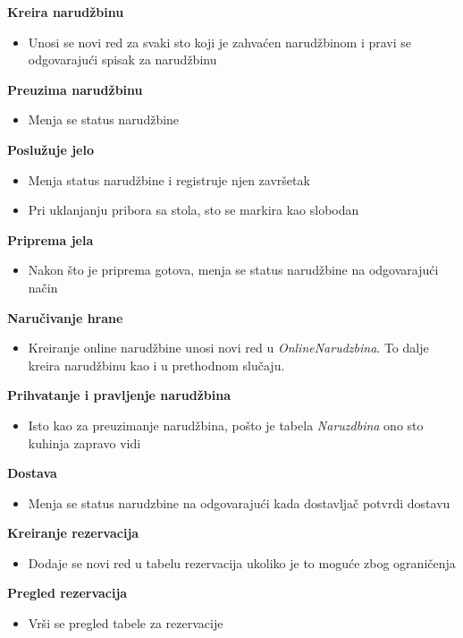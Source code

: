 \documentclass{article}
\begin{document}
\textbf{Kreira narudžbinu}
\begin{itemize}
\item Unosi se novi red za svaki sto koji je zahvaćen narudžbinom i pravi se odgovarajući spisak za narudžbinu
\end{itemize}


\textbf{Preuzima narudžbinu}
\begin{itemize}
\item Menja se status narudžbine 
\end{itemize}

\textbf{Poslužuje jelo}
\begin{itemize}
\item Menja status narudžbine i registruje njen završetak
\item Pri uklanjanju pribora sa stola, sto se markira kao slobodan
\end{itemize}


\textbf{Priprema jela}
\begin{itemize}
\item Nakon što je priprema gotova, menja se status narudžbine na odgovarajući način
\end{itemize}


\textbf{Naručivanje hrane}
\begin{itemize}
\item Kreiranje online narudžbine unosi novi red u \emph{OnlineNarudzbina}. To dalje kreira narudžbinu kao i u prethodnom slučaju.
\end{itemize}

\textbf{Prihvatanje i pravljenje narudžbina}
\begin{itemize}
\item Isto kao za preuzimanje narudžbina, pošto je tabela \emph{Naruzdbina} ono sto kuhinja zapravo vidi
\end{itemize}


\textbf{Dostava}
\begin{itemize}
\item Menja se status narudzbine na odgovarajući kada dostavljač potvrdi dostavu
\end{itemize}

\textbf{Kreiranje rezervacija}
\begin{itemize}
\item  Dodaje se novi red u tabelu rezervacija ukoliko je to moguće zbog ograničenja 
\end{itemize}


\textbf{Pregled rezervacija}
\begin{itemize}
\item Vrši se pregled tabele za rezervacije 
\end{itemize}
\end{document}
